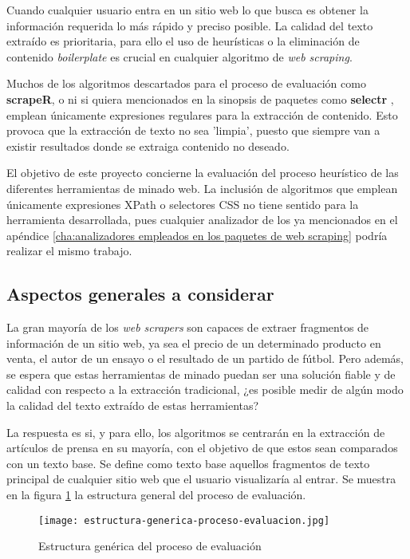 Cuando cualquier usuario entra en un sitio web lo que busca es obtener la información requerida lo más
rápido y preciso posible. La calidad del texto extraído es prioritaria, para ello el uso de heurísticas o
la eliminación de contenido \emph{boilerplate} es crucial en cualquier algoritmo de \emph{web scraping}.

Muchos de los algoritmos descartados para el proceso de evaluación como \textbf{scrapeR}, o ni si quiera 
mencionados en la sinopsis de paquetes como \textbf{selectr} \cite{selectr}, emplean únicamente expresiones 
regulares para la extracción de contenido. Esto provoca que la extracción de texto no sea 'limpia', puesto 
que siempre van a existir resultados donde se extraiga contenido no deseado.

El objetivo de este proyecto concierne la evaluación del proceso heurístico de las diferentes herramientas
de minado web. La inclusión de algoritmos que emplean únicamente expresiones XPath o selectores CSS no
tiene sentido para la herramienta desarrollada, pues cualquier analizador de los ya mencionados en el
apéndice \ref{cha:analizadores empleados en los paquetes de web scraping} podría realizar el mismo trabajo.

\subsection{Aspectos generales a considerar}
\label{subsec:aspectos generales a considerar}

La gran mayoría de los \emph{web scrapers} son capaces de extraer fragmentos de información de un sitio
web, ya sea el precio de un determinado producto en venta, el autor de un ensayo o el resultado de un 
partido de fútbol. Pero además, se espera que estas herramientas de minado puedan ser una solución fiable 
y de calidad con respecto a la extracción tradicional, ¿es posible medir de algún modo la calidad del texto 
extraído de estas herramientas?

La respuesta es si, y para ello, los algoritmos se centrarán en la extracción de artículos de prensa en su
mayoría, con el objetivo de que estos sean comparados con un texto base. Se define como texto base aquellos 
fragmentos de texto principal de cualquier sitio web que el usuario visualizaría al entrar. Se muestra en 
la figura \ref{img:estructura generica del proceso de evaluacion} la estructura general del proceso de 
evaluación.

\begin{figure}[tphb]
  \centering
  \texttt{[image: estructura-generica-proceso-evaluacion.jpg]}
  \caption{Estructura genérica del proceso de evaluación}
  \label{img:estructura generica del proceso de evaluacion}
\end{figure}

